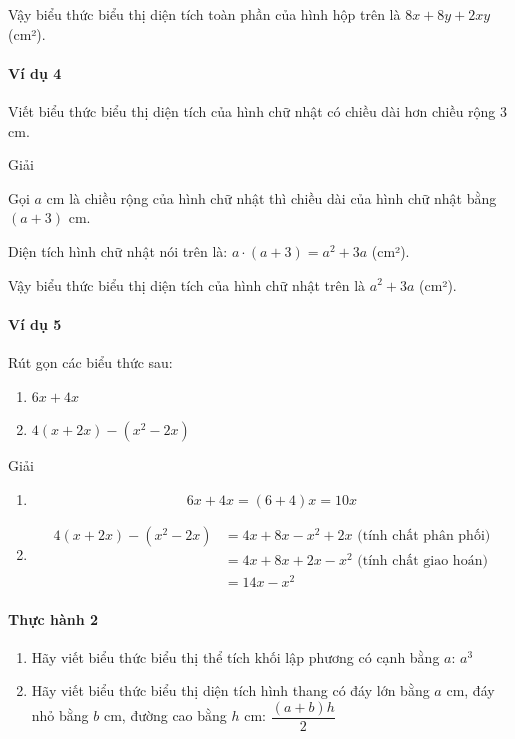\documentclass[
]{article}
\begin{document}
Vậy biểu thức biểu thị diện tích toàn phần của hình hộp trên là
\(8x + 8y + 2xy\) (cm²).

\paragraph{Ví dụ 4}\label{vuxed-dux1ee5-4}

Viết biểu thức biểu thị diện tích của hình chữ nhật có chiều dài hơn
chiều rộng 3 cm.

Giải

Gọi \(a\) cm là chiều rộng của hình chữ nhật thì chiều dài của hình chữ
nhật bằng \((a + 3)\) cm.

Diện tích hình chữ nhật nói trên là: \(a \cdot (a + 3) = a^2 + 3a\)
(cm²).

Vậy biểu thức biểu thị diện tích của hình chữ nhật trên là \(a^2 + 3a\)
(cm²).

\paragraph{Ví dụ 5}\label{vuxed-dux1ee5-5}

Rút gọn các biểu thức sau:

\begin{enumerate}
\def\labelenumi{\alph{enumi})}
\item
  \(6x + 4x\)
\item
  \(4(x + 2x) - (x^2 - 2x)\)
\end{enumerate}

Giải

\begin{enumerate}
\def\labelenumi{\alph{enumi})}
\item
  \[6x + 4x = (6 + 4)x = 10x\]
\item
  \begin{align*}
  4(x + 2x) - (x^2 - 2x) &= 4x + 8x - x^2 + 2x \text{ (tính chất phân phối)} \\
  &= 4x + 8x + 2x - x^2 \text{ (tính chất giao hoán)} \\
  &= 14x - x^2
  \end{align*}
\end{enumerate}

\paragraph{Thực hành 2}\label{thux1ef1c-huxe0nh-2}

\begin{enumerate}
\def\labelenumi{\alph{enumi})}
\item
  Hãy viết biểu thức biểu thị thể tích khối lập phương có cạnh bằng
  \(a\): \(a^3\)
\item
  Hãy viết biểu thức biểu thị diện tích hình thang có đáy lớn bằng \(a\)
  cm, đáy nhỏ bằng \(b\) cm, đường cao bằng \(h\) cm:
  \(\dfrac{(a + b)h}{2}\)
\end{enumerate}
\end{document}
